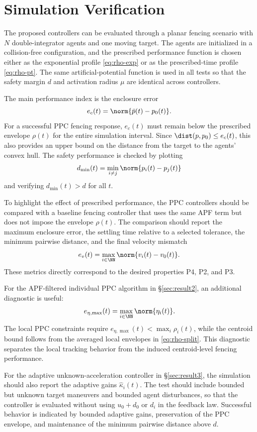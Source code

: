 \section{Simulation Verification}
\label{sec:simulation}

The proposed controllers can be evaluated through a planar fencing scenario
with $N$ double-integrator agents and one moving target.  The agents are
initialized in a collision-free configuration, and the prescribed
performance function is chosen either as the exponential profile
\eqref{eq:rho-exp} or as the prescribed-time profile \eqref{eq:rho-pt}.  The
same artificial-potential function is used in all tests so that the safety
margin $d$ and activation radius $\mu$ are identical across controllers.

The main performance index is the enclosure error
\[
e_c(t)=\norm{\bar p(t)-p_0(t)}.
\]
For a successful PPC fencing response, $e_c(t)$ must remain below the
prescribed envelope $\rho(t)$ for the entire simulation interval.  Since
$\dist(p,p_0)\le e_c(t)$, this also provides an upper bound on the distance
from the target to the agents' convex hull.  The safety performance is
checked by plotting
\[
d_{\min}(t)=\min_{i\neq j}\norm{p_i(t)-p_j(t)}
\]
and verifying $d_{\min}(t)>d$ for all $t$.

To highlight the effect of prescribed performance, the PPC controllers
should be compared with a baseline fencing controller that uses the same APF
term but does not impose the envelope $\rho(t)$.  The comparison should
report the maximum enclosure error, the settling time relative to a selected
tolerance, the minimum pairwise distance, and the final velocity mismatch
\[
e_v(t)=\max_{i\in\NN}\norm{v_i(t)-v_0(t)}.
\]
These metrics directly correspond to the desired properties P4, P2, and P3.

For the APF-filtered individual PPC algorithm in \S\ref{sec:result2}, an
additional diagnostic is useful:
\[
e_{\eta,\max}(t)=\max_{i\in\NN}\norm{\eta_i(t)}.
\]
The local PPC constraints require $e_{\eta,\max}(t)<\max_i\rho_i(t)$, while
the centroid bound follows from the averaged local envelopes in
\eqref{eq:rho-split}.  This diagnostic separates the local tracking behavior
from the induced centroid-level fencing performance.

For the adaptive unknown-acceleration controller in \S\ref{sec:result3}, the
simulation should also report the adaptive gains $\hat\kappa_i(t)$.  The
test should include bounded but unknown target maneuvers and bounded agent
disturbances, so that the controller is evaluated without using
$u_0+d_0$ or $d_i$ in the feedback law.  Successful behavior is indicated by
bounded adaptive gains, preservation of the PPC envelope, and maintenance of
the minimum pairwise distance above $d$.

